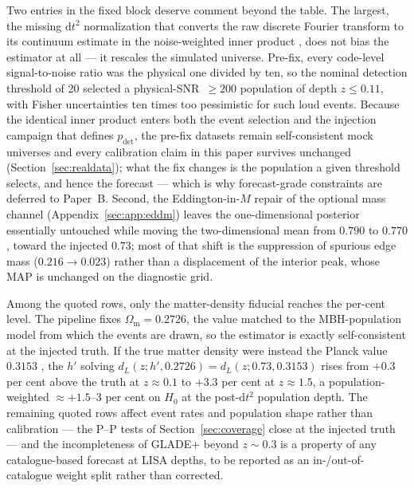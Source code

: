 Two entries in the fixed block deserve comment beyond the table. The largest, the missing $\mathrm{d}t^{2}$ normalization that converts the raw discrete Fourier transform to its continuum estimate in the noise-weighted inner product \citep{Babak:2023lro}, does not bias the estimator at all --- it rescales the simulated universe. Pre-fix, every code-level signal-to-noise ratio was the physical one divided by ten, so the nominal detection threshold of 20 selected a physical-SNR~$\geq 200$ population of depth $z \leq 0.11$, with Fisher uncertainties ten times too pessimistic for such loud events. %
Because the identical inner product enters both the event selection and the injection campaign that defines $p_\mathrm{det}$, the pre-fix datasets remain self-consistent mock universes and every calibration claim in this paper survives unchanged (Section~\ref{sec:realdata}); what the fix changes is the population a given threshold selects, and hence the forecast --- which is why forecast-grade constraints are deferred to Paper~B. %
Second, the Eddington-in-$M$ repair of the optional mass channel (Appendix~\ref{sec:app:eddm}) leaves the one-dimensional posterior essentially untouched while moving the two-dimensional mean from $0.790$ to $0.770$, toward the injected $0.73$; most of that shift is the suppression of spurious edge mass ($0.216 \to 0.023$) rather than a displacement of the interior peak, whose MAP is unchanged on the diagnostic grid. %

Among the quoted rows, only the matter-density fiducial reaches the per-cent level. The pipeline fixes $\Omega_{\mathrm{m}} = 0.2726$, the value matched to the MBH-population model \citep{Babak:2017tow,Barausse:2012fy} from which the events are drawn, so the estimator is exactly self-consistent at the injected truth.
If the true matter density were instead the Planck value $0.3153$ \citep{Planck:2018vyg}, the $h'$ solving $d_L(z; h', 0.2726) = d_L(z; 0.73, 0.3153)$ rises from $+0.3$ per cent above the truth at $z \approx 0.1$ to $+3.3$ per cent at $z \approx 1.5$, a population-weighted $\approx +1.5$--$3$ per cent on $H_0$ at the post-$\mathrm{d}t^{2}$ population depth. %
The remaining quoted rows affect event rates and population shape rather than calibration --- the P--P tests of Section~\ref{sec:coverage} close at the injected truth --- and the incompleteness of GLADE+ \citep{Dalya:2021ewn} beyond $z \sim 0.3$ is a property of any catalogue-based forecast at LISA depths, to be reported as an in-/out-of-catalogue weight split rather than corrected. %

